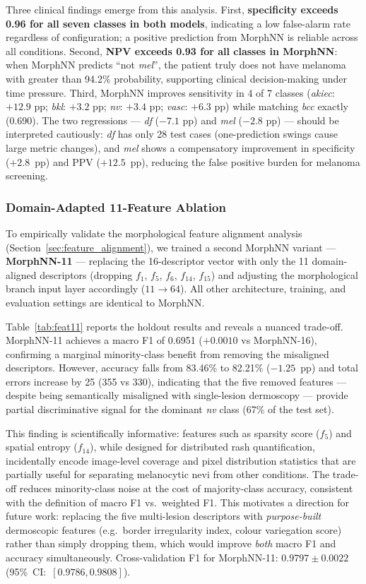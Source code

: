 \documentclass[preprint,12pt]{elsarticle}
\begin{document}
Three clinical findings emerge from this analysis.
First, \textbf{specificity exceeds 0.96 for all seven classes in both
models}, indicating a low false-alarm rate regardless of configuration;
a positive prediction from MorphNN is reliable across all conditions.
Second, \textbf{NPV exceeds 0.93 for all classes in MorphNN}: when
MorphNN predicts ``not \textit{mel}'', the patient truly does not have
melanoma with greater than 94.2\% probability, supporting clinical
decision-making under time pressure.
Third, MorphNN improves sensitivity in 4 of 7 classes (\textit{akiec}:
$+12.9$ pp; \textit{bkl}: $+3.2$ pp; \textit{nv}: $+3.4$ pp;
\textit{vasc}: $+6.3$ pp) while matching \textit{bcc} exactly (0.690).
The two regressions --- \textit{df} ($-7.1$ pp) and \textit{mel}
($-2.8$ pp) --- should be interpreted cautiously: \textit{df} has only
28 test cases (one-prediction swings cause large metric changes), and
\textit{mel} shows a compensatory improvement in specificity ($+2.8$~pp)
and PPV ($+12.5$~pp), reducing the false positive burden for melanoma
screening.


\subsubsection{Domain-Adapted 11-Feature Ablation}
\label{sec:feat11}

To empirically validate the morphological feature alignment analysis
(Section~\ref{sec:feature_alignment}), we trained a second MorphNN
variant --- \textbf{MorphNN-11} --- replacing the 16-descriptor vector
with only the 11 domain-aligned descriptors (dropping $f_1$, $f_5$,
$f_6$, $f_{14}$, $f_{15}$) and adjusting the morphological branch input
layer accordingly ($11 \to 64$).  All other architecture, training, and
evaluation settings are identical to MorphNN.

Table~\ref{tab:feat11} reports the holdout results and reveals a nuanced
trade-off.  MorphNN-11 achieves a macro F1 of 0.6951 ($+0.0010$ vs
MorphNN-16), confirming a marginal minority-class benefit from removing
the misaligned descriptors.  However, accuracy falls from 83.46\% to
82.21\% ($-1.25$~pp) and total errors increase by 25 (355 vs 330),
indicating that the five removed features --- despite being semantically
misaligned with single-lesion dermoscopy --- provide partial discriminative
signal for the dominant \textit{nv} class (67\% of the test set).

This finding is scientifically informative: features such as sparsity
score ($f_5$) and spatial entropy ($f_{14}$), while designed for
distributed rash quantification, incidentally encode image-level coverage
and pixel distribution statistics that are partially useful for separating
melanocytic nevi from other conditions.  The trade-off reduces minority-class
noise at the cost of majority-class accuracy, consistent with the definition
of macro F1 vs.\ weighted F1.  This motivates a direction for future
work: replacing the five multi-lesion descriptors with \emph{purpose-built}
dermoscopic features (e.g.\ border irregularity index, colour
variegation score) rather than simply dropping them, which would improve
\emph{both} macro F1 and accuracy simultaneously.
Cross-validation F1 for MorphNN-11:
$0.9797 \pm 0.0022$ (95\%~CI:~$[0.9786, 0.9808]$).
\end{document}

